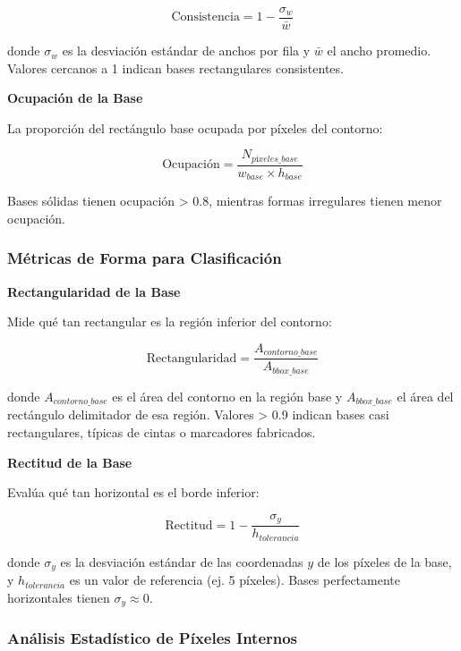 \begin{equation}
\text{Consistencia} = 1 - \frac{\sigma_{w}}{\bar{w}}
\end{equation}

donde $\sigma_w$ es la desviación estándar de anchos por fila y $\bar{w}$ el ancho promedio. Valores cercanos a 1 indican bases rectangulares consistentes.

\textbf{Ocupación de la Base}

La proporción del rectángulo base ocupada por píxeles del contorno:

\begin{equation}
\text{Ocupación} = \frac{N_{píxeles\_base}}{w_{base} \times h_{base}}
\end{equation}

Bases sólidas tienen ocupación > 0.8, mientras formas irregulares tienen menor ocupación.

\subsubsection{Métricas de Forma para Clasificación}

\textbf{Rectangularidad de la Base}

Mide qué tan rectangular es la región inferior del contorno:

\begin{equation}
\text{Rectangularidad} = \frac{A_{contorno\_base}}{A_{bbox\_base}}
\end{equation}

donde $A_{contorno\_base}$ es el área del contorno en la región base y $A_{bbox\_base}$ el área del rectángulo delimitador de esa región. Valores > 0.9 indican bases casi rectangulares, típicas de cintas o marcadores fabricados.

\textbf{Rectitud de la Base}

Evalúa qué tan horizontal es el borde inferior:

\begin{equation}
\text{Rectitud} = 1 - \frac{\sigma_y}{h_{tolerancia}}
\end{equation}

donde $\sigma_y$ es la desviación estándar de las coordenadas $y$ de los píxeles de la base, y $h_{tolerancia}$ es un valor de referencia (ej. 5 píxeles). Bases perfectamente horizontales tienen $\sigma_y \approx 0$.

\subsubsection{Análisis Estadístico de Píxeles Internos}

